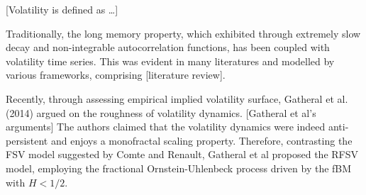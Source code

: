 \documentclass[12pt]{report}
\begin{document}
[Volatility is defined as …]
\par
Traditionally, the long memory property, which exhibited through extremely slow decay and non-integrable autocorrelation functions, has been coupled with volatility time series. This was evident in many literatures and modelled by various frameworks, comprising [literature review].
\par
Recently, through assessing empirical implied volatility surface, Gatheral et al. (2014) argued on the roughness of volatility dynamics. [Gatheral et al’s arguments] The authors claimed that the volatility dynamics were indeed anti-persistent and enjoys a monofractal scaling property. Therefore, contrasting the FSV model suggested by Comte and Renault, Gatheral et al proposed the RFSV model, employing the fractional Ornstein-Uhlenbeck process driven by the fBM with $H<1/2$.
\end{document}
